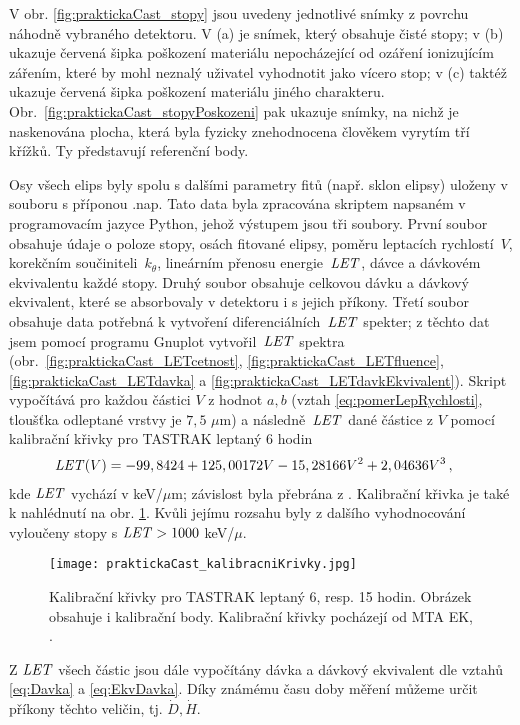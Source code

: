 V obr. \ref{fig:praktickaCast_stopy} jsou uvedeny jednotlivé snímky z povrchu náhodně vybraného detektoru. V (a) je snímek, který obsahuje čisté stopy; v (b) ukazuje červená šipka poškození materiálu nepocházející od ozáření ionizujícím zářením, které by mohl neznalý uživatel vyhodnotit jako vícero stop; v (c) taktéž ukazuje červená šipka poškození materiálu jiného charakteru. Obr.~\ref{fig:praktickaCast_stopyPoskozeni} pak ukazuje snímky, na nichž je naskenována plocha, která byla fyzicky znehodnocena člověkem vyrytím tří křížků. Ty představují referenční body. 

Osy všech elips byly spolu s dalšími parametry fitů (např. sklon elipsy) uloženy v souboru s příponou .nap. Tato data byla zpracována skriptem napsaném v programovacím jazyce Python, jehož výstupem jsou tři soubory. První soubor obsahuje údaje o poloze stopy, osách fitované elipsy, poměru leptacích rychlostí~$V$, korekčním součiniteli~$k_{\theta}$, lineárním přenosu energie~$\mathit{LET}$, dávce a dávkovém ekvivalentu každé stopy. Druhý soubor obsahuje celkovou dávku a dávkový ekvivalent, které se absorbovaly v detektoru i s jejich příkony. Třetí soubor obsahuje data potřebná k vytvoření diferenciálních~$\mathit{LET}$ spekter; z těchto dat jsem pomocí programu Gnuplot vytvořil~$\mathit{LET}$ spektra (obr.~\ref{fig:praktickaCast_LETcetnost}, \ref{fig:praktickaCast_LETfluence},
\ref{fig:praktickaCast_LETdavka} a \ref{fig:praktickaCast_LETdavkEkvivalent}). Skript vypočítává pro každou částici $V$ z hodnot $a,b$ (vztah \eqref{eq:pomerLepRychlosti}, tloušťka odleptané vrstvy je $7,5$
$\mu$m) a následně~$\mathit{LET}$ dané částice z $V$ pomocí kalibrační křivky pro TASTRAK leptaný 6 hodin
\begin{align}
  \mathit{LET}(V) &= -99,8424+125,00172  V-15,28166  V^2+2,04636  V^3\,,\label{eq:kalibracniKrivkaSestHod}
\end{align}
kde $\mathit{LET}$ vychází v keV/$\mu$m; závislost byla přebrána z \cite{ssntd}. Kalibrační křivka je také k nahlédnutí na obr. \ref{fig:praktickaCast_kalibracniKrivky}. Kvůli jejímu rozsahu byly z dalšího vyhodnocování vyloučeny stopy s $\mathit{LET}>1000$ keV/$\mu$.
\begin{figure}[ht]
  \centering
  \texttt{[image: praktickaCast\_kalibracniKrivky.jpg]}
  \caption{Kalibrační křivky pro TASTRAK leptaný 6, resp. 15 hodin. Obrázek obsahuje i kalibrační body. Kalibrační křivky pocházejí od MTA EK, \cite{ssntd}.}
  \label{fig:praktickaCast_kalibracniKrivky}
\end{figure}
Z $\mathit{LET}$ všech částic jsou dále vypočítány dávka a dávkový ekvivalent dle vztahů \eqref{eq:Davka} a \eqref{eq:EkvDavka}. Díky známému času doby měření můžeme určit příkony těchto veličin, tj. $\dot{D}, \dot{H}$.

